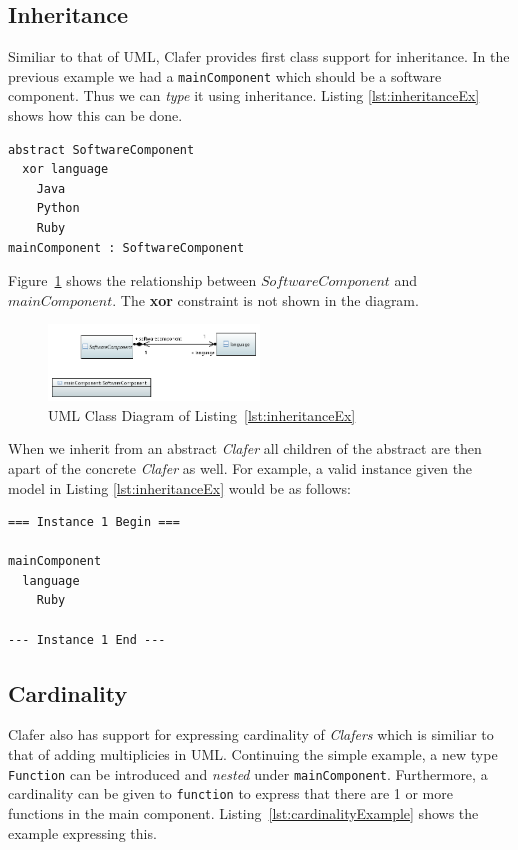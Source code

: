 \documentclass[10pt,oneside]{IEEEtran}
\begin{document}
\subsection{Inheritance}
Similiar to that of UML, Clafer provides first class support for inheritance. In the previous
example we had a \lstinline$mainComponent$ which should be a software component. Thus we can
\textit{type} it using inheritance. Listing \ref{lst:inheritanceEx} shows how this can be done.

\begin{lstlisting}[label={lst:inheritanceEx},caption={Inheritance example}]
abstract SoftwareComponent
  xor language
    Java
    Python
    Ruby
mainComponent : SoftwareComponent
\end{lstlisting}

Figure~\ref{fig:UML_Class_Diagram_partB} shows the relationship between $SoftwareComponent$ and $mainComponent$. The \textbf{xor} constraint is not shown in the diagram.

\begin{figure}[h]
  \caption{UML Class Diagram of Listing~\ref{lst:inheritanceEx}}
  \label{fig:UML_Class_Diagram_partB}
  \centering
  \includegraphics[width=0.5\textwidth]{UML_Class_Diagram_partB}
\end{figure}

When we inherit from an abstract \textit{Clafer} all children of the abstract are then apart of the concrete \textit{Clafer} as well. For example, a valid instance given the model in Listing \ref{lst:inheritanceEx} would be as follows:

\begin{Verbatim}[fontsize=\footnotesize]
=== Instance 1 Begin ===

mainComponent
  language
    Ruby

--- Instance 1 End ---
\end{Verbatim}


\subsection{Cardinality}
Clafer also has support for expressing cardinality of \textit{Clafers} which is similiar to
that of adding multiplicies in UML. Continuing the simple example, a new type \lstinline$Function$ can be introduced
and \textit{nested} under \lstinline$mainComponent$. Furthermore, a cardinality can be given to
\lstinline$function$ to express that there are 1 or more functions in the main component.
Listing~\ref{lst:cardinalityExample} shows the example expressing this.
\end{document}
